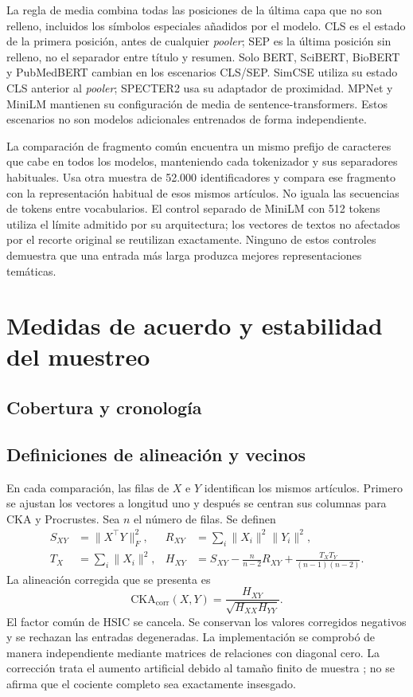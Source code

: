 \documentclass[12pt]{article}
\begin{document}
La regla de media combina todas las posiciones de la última capa que no son relleno, incluidos los símbolos especiales añadidos por el modelo. CLS es el estado de la primera posición, antes de cualquier \emph{pooler}; SEP es la última posición sin relleno, no el separador entre título y resumen. Solo BERT, SciBERT, BioBERT y PubMedBERT cambian en los escenarios CLS/SEP. SimCSE utiliza su estado CLS anterior al \emph{pooler}; SPECTER2 usa su adaptador de proximidad. MPNet y MiniLM mantienen su configuración de media de sentence-transformers. Estos escenarios no son modelos adicionales entrenados de forma independiente.

La comparación de fragmento común encuentra un mismo prefijo de caracteres que cabe en todos los modelos, manteniendo cada tokenizador y sus separadores habituales. Usa otra muestra de 52.000 identificadores y compara ese fragmento con la representación habitual de esos mismos artículos. No iguala las secuencias de tokens entre vocabularios. El control separado de MiniLM con 512 tokens utiliza el límite admitido por su arquitectura; los vectores de textos no afectados por el recorte original se reutilizan exactamente. Ninguno de estos controles demuestra que una entrada más larga produzca mejores representaciones temáticas.
\clearpage

\FloatBarrier

\clearpage
\section{Medidas de acuerdo y estabilidad del muestreo}
\subsection{Cobertura y cronología}

\subsection{Definiciones de alineación y vecinos}
En cada comparación, las filas de $X$ e $Y$ identifican los mismos artículos. Primero se ajustan los vectores a longitud uno y después se centran sus columnas para CKA y Procrustes. Sea $n$ el número de filas. Se definen
\begin{align*}
S_{XY}&=\lVert X^\top Y\rVert_F^2, &
R_{XY}&=\sum_i\lVert X_i\rVert^2\lVert Y_i\rVert^2,\\
T_X&=\sum_i\lVert X_i\rVert^2, &
H_{XY}&=S_{XY}-\frac{n}{n-2}R_{XY}
+\frac{T_XT_Y}{(n-1)(n-2)}.
\end{align*}
La alineación corregida que se presenta es
\[
\mathrm{CKA}_{\mathrm{corr}}(X,Y)=\frac{H_{XY}}{\sqrt{H_{XX}H_{YY}}}.
\]
El factor común de HSIC se cancela. Se conservan los valores corregidos negativos y se rechazan las entradas degeneradas. La implementación se comprobó de manera independiente mediante matrices de relaciones con diagonal cero. La corrección trata el aumento artificial debido al tamaño finito de muestra \citep{pmlr-v97-kornblith19a,refa961d84a4e}; no se afirma que el cociente completo sea exactamente insesgado.
\end{document}
